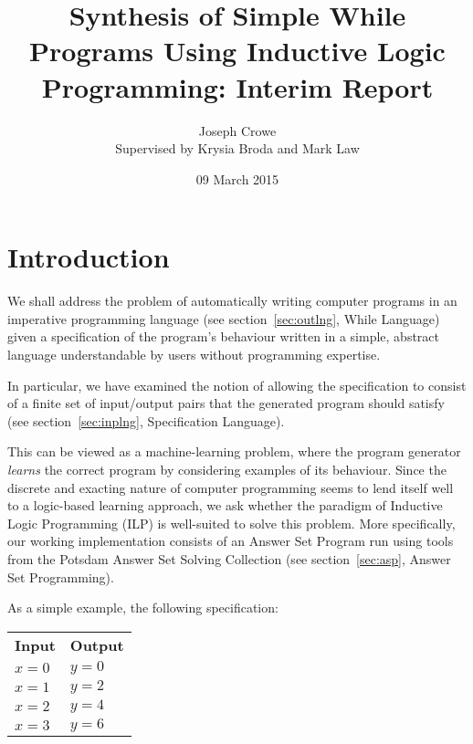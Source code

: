 \documentclass[a4paper,twoside,notitlepage]{article}
\begin{document}
\title{Synthesis of Simple While Programs Using Inductive Logic Programming:
       Interim Report}
\author{Joseph Crowe \\ Supervised by Krysia Broda and Mark Law}
\date{09 March 2015}
\maketitle

\abstract

\tableofcontents
\clearpage

\section{Introduction}

We shall address the problem of automatically writing computer programs in an 
imperative programming language (see section~\ref{sec:outlng}, While Language) 
given a specification of the program's behaviour written in a simple, abstract 
language understandable by users without programming expertise.

In particular, we have examined the notion of allowing the specification to 
consist of a finite set of input/output pairs that the generated program 
should satisfy (see section~\ref{sec:inplng}, Specification Language).

This can be viewed as a machine-learning problem, where the program generator 
\emph{learns} the correct program by considering examples of its behaviour. Since the 
discrete and exacting nature of computer programming seems to lend itself well to a 
logic-based learning approach, we ask whether the paradigm of Inductive Logic 
Programming (ILP)\cite{muggleton94} is well-suited to solve this problem. More 
specifically, our working implementation consists of an Answer Set Program run using 
tools from the Potsdam Answer Set Solving Collection\cite{potassco} (see 
section~\ref{sec:asp}, Answer Set Programming).

As a simple example, the following specification:

\begin{tabular}{ll}
    \textbf{Input} & \textbf{Output}
\\  $x = 0$        & $y = 0$
\\  $x = 1$        & $y = 2$
\\  $x = 2$        & $y = 4$
\\  $x = 3$        & $y = 6$
\end{tabular}
\end{document}
